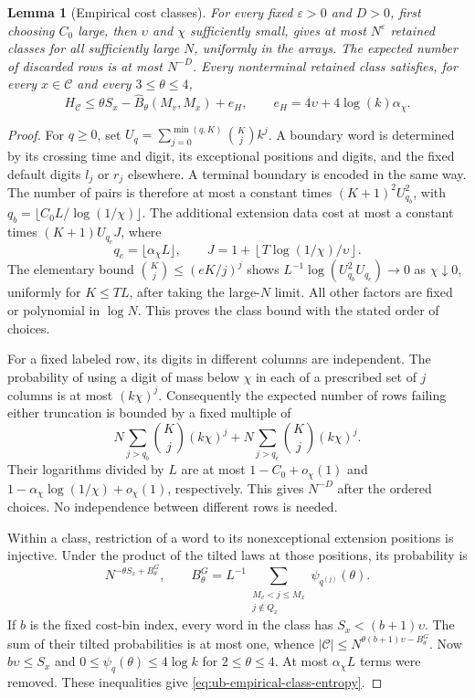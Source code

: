 \documentclass[11pt]{article}
\numberwithin{equation}{section}
\newtheorem{lemma}[lemma]{Lemma}
\newcommand{\1}{\mathbf 1}
\begin{document}
\begin{lemma}[Empirical cost classes]
\label{lem:ub-empirical-cost-classes}
For every fixed $\varepsilon>0$ and $D>0$, first choosing $C_0$ large,
then $\upsilon$ and $\chi$ sufficiently small, gives at most
$N^\varepsilon$ retained classes for all sufficiently large $N$,
uniformly in the arrays. The expected number of discarded rows is at
most $N^{-D}$. Every nonterminal retained class satisfies, for every
$x\in\mathcal C$ and every $3\le\theta\le4$,
\begin{equation}
\label{eq:ub-empirical-class-entropy}
 H_{\mathcal C}\le\theta S_x-\widehat B_\theta(M_v,M_x)+e_H,
 \qquad e_H=4\upsilon+4\log(k)\alpha_\chi.
\end{equation}
\end{lemma}

\begin{proof}
For $q\ge0$, set
$U_q=\sum_{j=0}^{\min(q,K)}\binom Kj k^j$.
A boundary word is determined by its crossing time and digit, its
exceptional positions and digits, and the fixed default digits $l_j$
or $r_j$ elsewhere. A terminal boundary is encoded in the same way.
The number of pairs is therefore at most a constant times
$(K+1)^2U_{q_b}^2$, with
$q_b=\lfloor C_0L/\log(1/\chi)\rfloor$.
The additional extension data cost at most a constant times
$(K+1)U_{q_e}J$, where
\[
 q_e=\lfloor\alpha_\chi L\rfloor,\qquad
 J=1+\left\lfloor T\log(1/\chi)/\upsilon\right\rfloor.
\]
The elementary bound $\binom Kj\le(eK/j)^j$ shows
$L^{-1}\log(U_{q_b}^2U_{q_e})\to0$ as $\chi\downarrow0$, uniformly
for $K\le TL$, after taking the large-$N$ limit. All other factors
are fixed or polynomial in $\log N$. This proves the class bound
with the stated order of choices.

For a fixed labeled row, its digits in different columns are independent.
The probability of using a digit of mass below $\chi$ in each of a
prescribed set of $j$ columns is at most $(k\chi)^j$.
Consequently the expected number of rows failing either truncation is
bounded by a fixed multiple of
\[
 N\sum_{j>q_b}\binom Kj(k\chi)^j
   +N\sum_{j>q_e}\binom Kj(k\chi)^j.
\]
Their logarithms divided by $L$ are at most
$1-C_0+o_\chi(1)$ and
$1-\alpha_\chi\log(1/\chi)+o_\chi(1)$, respectively.
This gives $N^{-D}$ after the ordered choices. No independence between
different rows is needed.

Within a class, restriction of a word to its nonexceptional extension
positions is injective. Under the product of the tilted laws at those
positions, its probability is
\[
 N^{-\theta S_x+B^G_\theta},\qquad
 B^G_\theta=L^{-1}\sum_{\substack{M_v<j\le M_x\\j\notin Q_x}}
                           \psi_{q^{(j)}}(\theta).
\]
If $b$ is the fixed cost-bin index, every word in the class has
$S_x<(b+1)\upsilon$. The sum of their tilted probabilities is at most
one, whence
$|\mathcal C|\le N^{\theta(b+1)\upsilon-B^G_\theta}$.
Now $b\upsilon\le S_x$ and
$0\le\psi_q(\theta)\le4\log k$ for $2\le\theta\le4$.
At most $\alpha_\chi L$ terms were removed. These inequalities give
\eqref{eq:ub-empirical-class-entropy}.
\end{proof}
\end{document}
